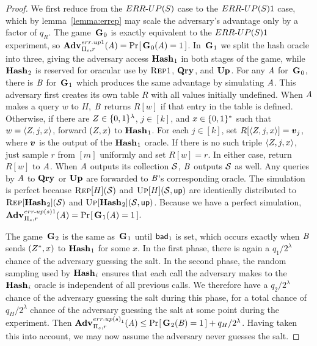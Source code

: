 \begin{proof}

We first reduce from the ${ERR\mbox{-}UP(S)}$ case to the ${ERR\mbox{-}UP(S)}1$ case, which by
lemma~\ref{lemma:errep} may scale the adversary's advantage only by a factor of
$q_R$. The game~$\mathbf{G}\hspace{0.5pt}_0$ is exactly equivalent to the ${ERR\mbox{-}UP(S)}1$ experiment, so
$\Adv{\errep1}_{\struct_s,r}(\advA) = \Prob{\game_0(\advA) = 1}$. In~$\mathbf{G}\hspace{0.5pt}_1$
we split the hash oracle into three, giving the adversary access $\mathbf{Hash}\hspace{0.5pt}_1$ in
both stages of the game, while $\mathbf{Hash}\hspace{0.5pt}_2$ is reserved for oracular use by
$\textnormal{\textsc{Rep}}1$, $\mathbf{Qry}\hspace{0.5pt}$, and $\mathbf{Up}\hspace{0.5pt}$. For any $\mathit{A}$ for~$\mathbf{G}\hspace{0.5pt}_0$, there is $\mathit{B}$
for~$\mathbf{G}\hspace{0.5pt}_1$ which produces the same advantage by simulating $\mathit{A}$. This
adversary first creates its own table $R$ with all values initially undefined.
When $\mathit{A}$ makes a query $w$ to $H$, $\mathit{B}$ returns $R[w]$ if that entry in
the table is defined. Otherwise, if there are $Z \in \{0,1\}^\lambda$, $j \in
[k]$, and $x \in \{0,1\}^*$ such that $w = \langle Z, j, x\rangle$, forward
$(Z,x)$ to $\mathbf{Hash}\hspace{0.5pt}_1$. For each $j \in [k]$, set $R[\langle Z, j,
x\rangle] = \boldsymbol{v}_j$, where $\boldsymbol{v}$ is the output of the $\mathbf{Hash}\hspace{0.5pt}_1$ oracle. If there
is no such triple $\langle Z, j, x\rangle$, just sample $r$ from $[m]$
uniformly and set $R[w] = r$. In either case, return $R[w]$ to $\mathit{A}$. When
$\mathit{A}$ outputs its collection $\mathcal{S}$, $\mathit{B}$ outputs $\mathcal{S}$ as well. Any
queries by $\mathit{A}$ to $\mathbf{Qry}\hspace{0.5pt}$ or $\mathbf{Up}\hspace{0.5pt}$ are forwarded to $\mathit{B}$'s corresponding
oracle. The simulation is perfect because $\textnormal{\textsc{Rep}}[H](\mathcal{S})$ and $\textnormal{\textsc{Up}}[H](\mathcal{S},\mathsf{up})$
are identically distributed to $\textnormal{\textsc{Rep}}[\mathbf{Hash}\hspace{0.5pt}_2](\mathcal{S})$ and
$\textnormal{\textsc{Up}}[\mathbf{Hash}\hspace{0.5pt}_2](\mathcal{S},\mathsf{up})$. Because we have a perfect simulation,
$\Adv{\erreps1}_{\struct_s,r}(\advA) = \Prob{\game_1(\advA) = 1}$.

The game~$\mathbf{G}\hspace{0.5pt}_2$ is the same as~$\mathbf{G}\hspace{0.5pt}_1$ until $\mathsf{bad}_1$ is set, which occurs
exactly when $\mathit{B}$ sends $(Z^*,x)$ to $\mathbf{Hash}\hspace{0.5pt}_1$ for some $x$. In the
first phase, there is again a $q_1/2^\lambda$ chance of the adversary guessing
the salt. In the second phase, the random sampling used by $\mathbf{Hash}\hspace{0.5pt}_i$ ensures
that each call the adversary makes to the $\mathbf{Hash}\hspace{0.5pt}_i$ oracle is independent of
all previous calls. We therefore have a $q_2/2^\lambda$ chance of the adversary
guessing the salt during this phase, for a total chance of $q_H/2^\lambda$
chance of the adversary guessing the salt at some point during the experiment.
Then $\Adv{\erreps_1}_{\struct_s,r}(\advA) \le \Prob{\game_2(\advB) = 1} +
q_H/2^\lambda$. Having taken this into account, we may now assume the adversary
never guesses the salt.


\end{proof}
